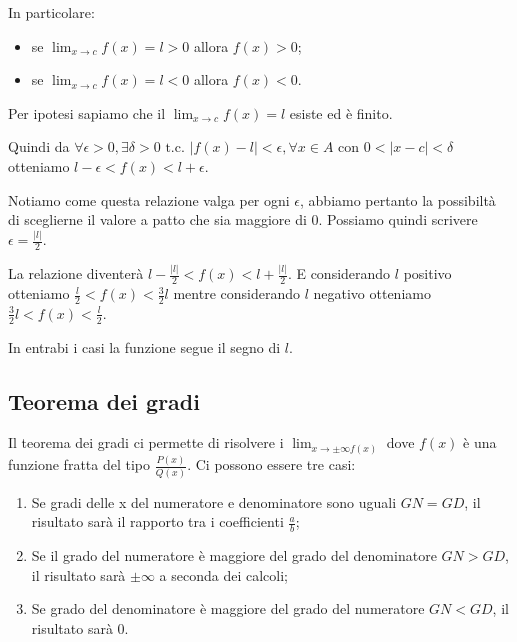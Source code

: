 In particolare:
\begin{itemize}
    \item se $\lim_{x\to c}f(x)=l>0$ allora $f(x)>0$;
    \item se $\lim_{x\to c}f(x)=l<0$ allora $f(x)<0$.
\end{itemize}

\begin{dimostration}
    Per ipotesi sapiamo che il $\lim_{x\to c}f(x)=l$ esiste ed è finito.
    
    Quindi da $\forall\epsilon>0,\exists\delta>0\text{ t.c. }|f(x)-l|<\epsilon, \forall x\in A\text{ con } 0<|x-c|<\delta$ otteniamo $l-\epsilon<f(x)<l+\epsilon$.
    
    Notiamo come questa relazione valga per ogni $\epsilon$, abbiamo pertanto la possibiltà di sceglierne il valore a patto che sia maggiore di 0. Possiamo quindi scrivere $\epsilon=\frac{|l|}{2}$.
    
    La relazione diventerà $l-\frac{|l|}{2}<f(x)<l+\frac{|l|}{2}$. E considerando $l$ positivo otteniamo $\frac{l}{2}<f(x)<\frac{3}{2}l$ mentre considerando $l$ negativo otteniamo $\frac{3}{2}l<f(x)<\frac{l}{2}$.
    
    In entrabi i casi la funzione segue il segno di $l$.\flushright{$\blacksquare$}
\end{dimostration}

\subsection*{Teorema dei gradi}\label{subsec:tdg}
Il teorema dei gradi ci permette di risolvere i $\lim_{x\to\pm\infty f(x)}$ dove $f(x)$ è una funzione fratta del tipo $\frac{P(x)}{Q(x)}$. Ci possono essere tre casi:
\begin{enumerate}
    \item Se gradi delle x del numeratore e denominatore sono uguali $GN=GD$, il risultato sarà il rapporto tra i coefficienti $\frac{a}{b}$;
    \item Se il grado del numeratore è maggiore del grado del denominatore $GN>GD$, il risultato sarà $\pm\infty$ a seconda dei calcoli;
    \item Se grado del denominatore è maggiore del grado del numeratore $GN<GD$, il risultato sarà 0.

\end{enumerate}

